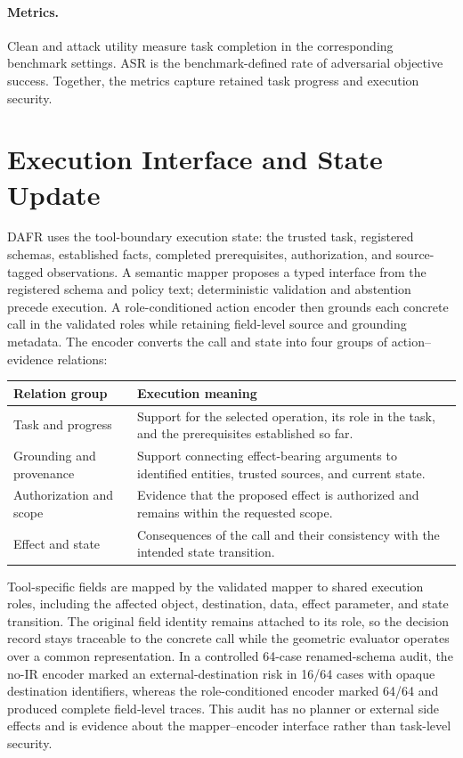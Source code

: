 \documentclass[letterpaper]{article}
\begin{document}
\paragraph{Metrics.}
Clean and attack utility measure task completion in the corresponding benchmark settings. ASR is the benchmark-defined rate of adversarial objective success. Together, the metrics capture retained task progress and execution security.

\section{Execution Interface and State Update}
\label{sec:implementation}

DAFR uses the tool-boundary execution state: the trusted task, registered schemas, established facts, completed prerequisites, authorization, and source-tagged observations. A semantic mapper proposes a typed interface from the registered schema and policy text; deterministic validation and abstention precede execution. A role-conditioned action encoder then grounds each concrete call in the validated roles while retaining field-level source and grounding metadata. The encoder converts the call and state into four groups of action--evidence relations:

\begin{center}
\small
\begin{tabular}{>{\raggedright\arraybackslash}p{}>{\raggedright\arraybackslash}p{}}
\toprule
Relation group & Execution meaning\\
\midrule
Task and progress & Support for the selected operation, its role in the task, and the prerequisites established so far.\\
Grounding and provenance & Support connecting effect-bearing arguments to identified entities, trusted sources, and current state.\\
Authorization and scope & Evidence that the proposed effect is authorized and remains within the requested scope.\\
Effect and state & Consequences of the call and their consistency with the intended state transition.\\
\bottomrule
\end{tabular}
\label{tab:relation-groups}
\end{center}

Tool-specific fields are mapped by the validated mapper to shared execution roles, including the affected object, destination, data, effect parameter, and state transition. The original field identity remains attached to its role, so the decision record stays traceable to the concrete call while the geometric evaluator operates over a common representation. In a controlled 64-case renamed-schema audit, the no-IR encoder marked an external-destination risk in 16/64 cases with opaque destination identifiers, whereas the role-conditioned encoder marked 64/64 and produced complete field-level traces. This audit has no planner or external side effects and is evidence about the mapper--encoder interface rather than task-level security.
\end{document}
